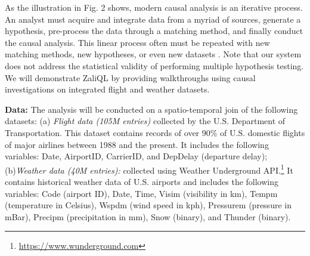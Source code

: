 As the illustration in Fig. 2 shows, modern causal analysis is an iterative process. An analyst must acquire and integrate data from a myriad of sources, generate a hypothesis, pre-process the data through a matching method, and finally conduct the causal analysis. This linear process often must be repeated with new matching methods, new hypotheses, or even new datasets \cite{IacKinPor09}. Note that our system does not address the statistical validity of performing multiple hypothesis testing. We will demonstrate ZaliQL by providing walkthroughs using causal investigations on integrated flight and weather datasets.

{\bf Data:} The analysis will be conducted on a spatio-temporal join of the following datasets: (a) {\em Flight data (105M entries)} collected by the U.S. Department of Transportation. This dataset contains records of over 90\% of U.S. domestic flights of major airlines between 1988 and the present. It includes the following variables: Date, AirportID, CarrierID, and DepDelay (departure delay); (b){\it Weather data (40M entries):} collected using Weather Underground API.\footnote{\url{https://www.wunderground.com}} It contains historical weather data of U.S. airports and includes the following variables: Code (airport ID), Date, Time, Visim (visibility in km), Tempm (temperature in Celsius), Wspdm (wind speed in kph), Pressurem (pressure in mBar), Precipm (precipitation in mm), Snow (binary), and Thunder (binary).

